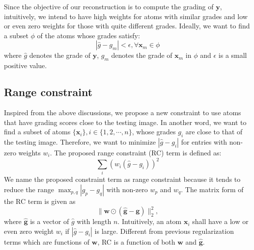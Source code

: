 \documentclass[journal]{IEEEtran}
\begin{document}
Since the objective of our reconstruction is to compute the grading of $\textbf{y}$, intuitively, we intend to have high weights for  atoms with similar grades and low or even zero weights for those with quite different grades. Ideally, we want to find a subset $\phi$ of the atoms whose grades satisfy:
\begin{equation}
   |\hat{g}-g_m| < \epsilon,  \forall \textbf{x}_m \in \phi
\end{equation}
where $\hat{g}$ denotes the grade of $\textbf{y}$, $g_m$ denotes the grade of $\textbf{x}_m$ in $\phi$ and $\epsilon$ is a small positive value. 
%
\subsection{Range constraint}
Inspired from the above discussions, we propose a new constraint to use
atoms that have grading scores close to the testing image. In another word, we want to find a
 subset of atoms $\{\textbf{x}_i \}, i\in \{1, 2, \cdots, n\}$, whose grades $g_i$ are close to that of the
 testing image. Therefore, we want to minimize $ |\hat{g}-g_i|$ for entries
 with non-zero weights $w_i$.   The proposed  range constraint (RC) term is defined as:
 \begin{equation}
    \sum_i (w_i(\hat{g}-g_i))^2
 \end{equation}
We name the proposed constraint term as range constraint because it tends to reduce the range  
 $\max_{p,q}|g_p-g_q|$  with non-zero $w_p$ and $w_q$.  
 The matrix form of the RC term is given as
 \begin{equation}
    \|\textbf{w}\odot (\hat{\textbf{g}} -\textbf{g})  \|_2^2,
 \end{equation}
 where $\hat{\textbf{g}}$ is a vector of $\hat{g}$ with length $n$.
  Intuitively, an atom $\textbf{x}_i$ shall have a low or even zero weight $w_i$ if    $|\hat{g}-g_i|$ is large.  %
 Different from previous regularization terms which are   functions of $\textbf{w}$, RC is a function of both $\textbf{w}$ and $\hat{\textbf{g}}$. 
\end{document}
